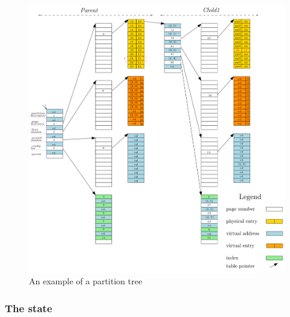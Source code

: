 \vfill 

\begin{figure}[!ht]  
	\centering 
	\includegraphics[width=1\linewidth, height=0.6\textheight, frame]{img/memoryEx.png} 
	\caption{An example of a partition tree}
	\label{partitionEx}
\end{figure}

\subsubsection{The state} \label{PIPstateSection}
 
